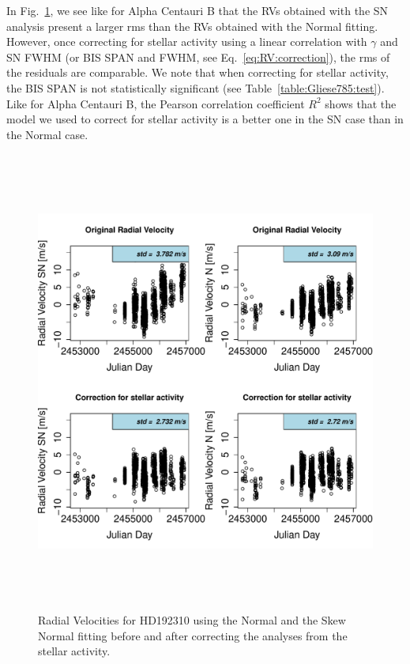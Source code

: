 \documentclass[11pt, oneside]{article}
\begin{document}
In Fig.~\ref{fig:Gliese785:correctionRV}, we see like for Alpha Centauri B that the RVs obtained with the SN analysis present a larger rms than the RVs obtained with the Normal fitting. However, once correcting for stellar activity using a linear correlation with $\gamma$ and SN FWHM (or BIS SPAN and FWHM, see Eq.~\ref{eq:RV:correction}), the rms of the residuals are comparable. We note that when correcting for stellar activity, the BIS SPAN is not statistically significant (see Table~\ref{table:Gliese785:test}). Like for Alpha Centauri B, the Pearson correlation coefficient $R^{2}$ shows  that the model we used to correct for stellar activity is a better one in the SN case than in the Normal case.
%
\begin{figure}[htbp]
   \centering
\includegraphics[height = 6in]{HD19231_[3]CorrectionActivity_RadialVelocity_vs_time.pdf} 
   \caption{Radial Velocities for HD192310 using the Normal and the Skew Normal fitting before and after correcting the analyses from the stellar activity.}
   \label{fig:Gliese785:correctionRV}
\end{figure}
%
\end{document}
